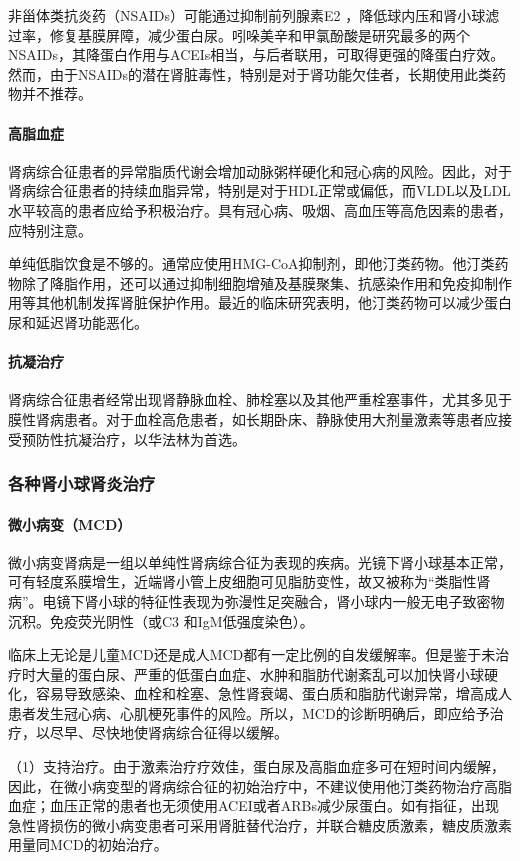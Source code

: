 非甾体类抗炎药（NSAIDs）可能通过抑制前列腺素E{2}
，降低球内压和肾小球滤过率，修复基膜屏障，减少蛋白尿。吲哚美辛和甲氯酚酸是研究最多的两个NSAIDs，其降蛋白作用与ACEIs相当，与后者联用，可取得更强的降蛋白疗效。然而，由于NSAIDs的潜在肾脏毒性，特别是对于肾功能欠佳者，长期使用此类药物并不推荐。
\paragraph{高脂血症}

肾病综合征患者的异常脂质代谢会增加动脉粥样硬化和冠心病的风险。因此，对于肾病综合征患者的持续血脂异常，特别是对于HDL正常或偏低，而VLDL以及LDL水平较高的患者应给予积极治疗。具有冠心病、吸烟、高血压等高危因素的患者，应特别注意。

单纯低脂饮食是不够的。通常应使用HMG-CoA抑制剂，即他汀类药物。他汀类药物除了降脂作用，还可以通过抑制细胞增殖及基膜聚集、抗感染作用和免疫抑制作用等其他机制发挥肾脏保护作用。最近的临床研究表明，他汀类药物可以减少蛋白尿和延迟肾功能恶化。
\paragraph{抗凝治疗}

肾病综合征患者经常出现肾静脉血栓、肺栓塞以及其他严重栓塞事件，尤其多见于膜性肾病患者。对于血栓高危患者，如长期卧床、静脉使用大剂量激素等患者应接受预防性抗凝治疗，以华法林为首选。

\subsubsection{各种肾小球肾炎治疗}
\paragraph{微小病变（MCD）}

微小病变肾病是一组以单纯性肾病综合征为表现的疾病。光镜下肾小球基本正常，可有轻度系膜增生，近端肾小管上皮细胞可见脂肪变性，故又被称为“类脂性肾病”。电镜下肾小球的特征性表现为弥漫性足突融合，肾小球内一般无电子致密物沉积。免疫荧光阴性（或C{3}
和IgM低强度染色）。

临床上无论是儿童MCD还是成人MCD都有一定比例的自发缓解率。但是鉴于未治疗时大量的蛋白尿、严重的低蛋白血症、水肿和脂肪代谢紊乱可以加快肾小球硬化，容易导致感染、血栓和栓塞、急性肾衰竭、蛋白质和脂肪代谢异常，增高成人患者发生冠心病、心肌梗死事件的风险。所以，MCD的诊断明确后，即应给予治疗，以尽早、尽快地使肾病综合征得以缓解。

（1）支持治疗。由于激素治疗疗效佳，蛋白尿及高脂血症多可在短时间内缓解，因此，在微小病变型的肾病综合征的初始治疗中，不建议使用他汀类药物治疗高脂血症；血压正常的患者也无须使用ACEI或者ARBs减少尿蛋白。如有指征，出现急性肾损伤的微小病变患者可采用肾脏替代治疗，并联合糖皮质激素，糖皮质激素用量同MCD的初始治疗。

